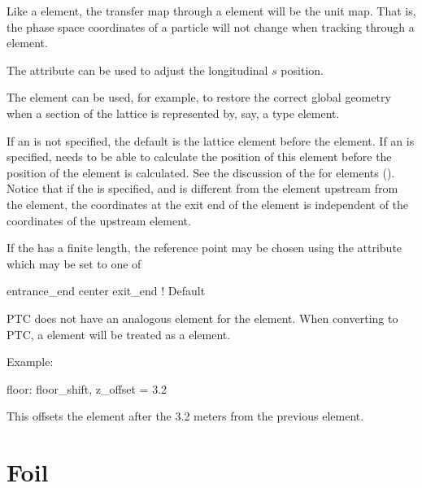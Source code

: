 Like a  element, the transfer map through a  element will be the
unit map. That is, the phase space coordinates of a particle will not change when tracking through a
 element. 

The  attribute can be used to adjust the longitudinal $s$ position.

The  element can be used, for example, to restore the
correct global geometry when a section of the lattice is represented by, say,
a  type element.

If an  is not specified, the default  is the lattice element before
the  element.  If an  is specified, \bmad needs to be able to
calculate the position of this element before the position of the  element is
calculated. See the discussion of the  for  elements
().  Notice that if the  is specified, and is different from the
element upstream from the  element, the coordinates at the exit end of the
 element is independent of the coordinates of the upstream element.

If the  has a finite length, the reference point may be chosen using the
 attribute which may be set to one of
\begin{example}
  entrance_end
  center
  exit_end         ! Default
\end{example}


PTC does not have an analogous element for the  element. When converting to PTC, a
 element will be treated as a  element.

Example: 
\begin{example}
  floor: floor_shift, z_offset = 3.2
\end{example}
This offsets the element after the  3.2 meters from the previous
element.

\newpage

\section{Foil}
\label{s:foil}

